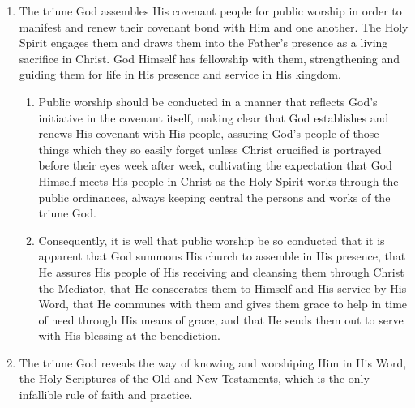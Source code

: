 \documentclass[
]{book}
\providecommand{\tightlist}{%
  \setlength{\itemsep}{0pt}\setlength{\parskip}{0pt}}
\begin{document}
\begin{enumerate}
\def\labelenumi{\arabic{enumi}.}
\setcounter{enumi}{4}
\tightlist
\item
  The triune God assembles His covenant people for public worship in order to manifest and renew their covenant bond with Him and one another. The Holy Spirit engages them and draws them into the Father's presence as a living sacrifice in Christ. God Himself has fellowship with them, strengthening and guiding them for life in His presence and service in His kingdom.

  \begin{enumerate}
  \def\labelenumii{\alph{enumii}.}
  \tightlist
  \item
    Public worship should be conducted in a manner that reflects God's initiative in the covenant itself, making clear that God establishes and renews His covenant with His people, assuring God's people of those things which they so easily forget unless Christ crucified is portrayed before their eyes week after week, cultivating the expectation that God Himself meets His people in Christ as the Holy Spirit works through the public ordinances, always keeping central the persons and works of the triune God.
  \item
    Consequently, it is well that public worship be so conducted that it is apparent that God summons His church to assemble in His presence, that He assures His people of His receiving and cleansing them through Christ the Mediator, that He consecrates them to Himself and His service by His Word, that He communes with them and gives them grace to help in time of need through His means of grace, and that He sends them out to serve with His blessing at the benediction.
  \end{enumerate}
\item
  The triune God reveals the way of knowing and worshiping Him in His Word, the Holy Scriptures of the Old and New Testaments, which is the only infallible rule of faith and practice.


\end{enumerate}
\end{document}
